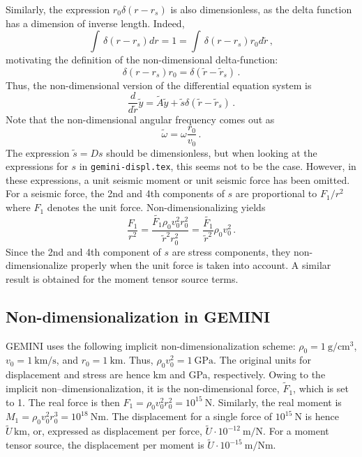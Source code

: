 \documentclass[11pt,a4paper]{article}
\begin{document}
Similarly, the expression $r_0\delta(r-r_s)$ is also dimensionless, 
as the delta function has a dimension of inverse length.
Indeed,
\begin{equation}
\int\,\delta(r-r_s)dr = 1 = \int\,\delta(r-r_s)r_0d\tilde{r} \,,
\end{equation}
motivating the definition of the non-dimensional delta-function:
\begin{equation}
\delta(r-r_s)r_0 = \delta(\tilde{r}-\tilde{r}_s) \,.
\end{equation}
Thus, the non-dimensional version of the differential equation system is
\begin{equation}
\frac{d}{d\tilde{r}}\tilde{y} = \tilde{A}\tilde{y}+\tilde{s}\delta(\tilde{r}-\tilde{r}_s) \,.
\end{equation}
%
Note that the non-dimensional angular frequency comes out as 
\begin{displaymath}
\tilde{\omega} = \omega\frac{r_0}{v_0} \,.
\end{displaymath}
The expression $\tilde{s}=Ds$ should be dimensionless, but when looking at the expressions for $s$ in \verb+gemini-displ.tex+,
this seems not to be the case. However, in these expressions, a unit seismic moment or unit seismic force has been omitted.
For a seismic force, the 2nd and 4th components of $s$ are proportional to $F_1/r^2$ where $F_1$ denotes the unit force.
Non-dimensionalizing yields 
\begin{displaymath}
\frac{F_1}{r^2} = \frac{\tilde{F_1}\rho_0v_0^2r_0^2}{\tilde{r}^2r_0^2} = \frac{\tilde{F_1}}{\tilde{r}^2}\rho_0v_0^2 \,.
\end{displaymath}
Since the 2nd and 4th component of $s$ are stress components, they non-dimensionalize properly when the unit force
is taken into account. A similar result is obtained for the moment tensor source terms.
%
\subsection{Non-dimensionalization in GEMINI}
%
GEMINI uses the following implicit non-dimensionalization scheme: $\rho_0 = 1\ \mbox{g}/\mbox{cm}^3$, $v_0 = 1\ \mbox{km}/\mbox{s}$,
and $r_0 = 1\ \mbox{km}$. Thus, $\rho_0v_0^2 = 1\ \mbox{GPa}$. The original units for displacement and stress are hence
km and GPa, respectively. Owing to the implicit non--dimensionalization, it is the non-dimensional force, $\tilde{F}_1$,
which is set to 1. The real force is then $F_1 = \rho_0v_0^2r_0^2 = 10^{15}\ \mbox{N}$. Similarly, the real moment
is $M_1 = \rho_0v_0^2r_0^3 = 10^{18}\ \mbox{Nm}$. The displacement for a single force of $10^{15}\ \mbox{N}$
is hence $\tilde{U}\,\mbox{km}$, or, expressed as displacement per force, $\tilde{U}\cdot 10^{-12}\ \mbox{m}/\mbox{N}$. 
For a moment tensor source, the displacement per moment is $\tilde{U}\cdot 10^{-15}\ \mbox{m}/\mbox{Nm}$.
\end{document}
